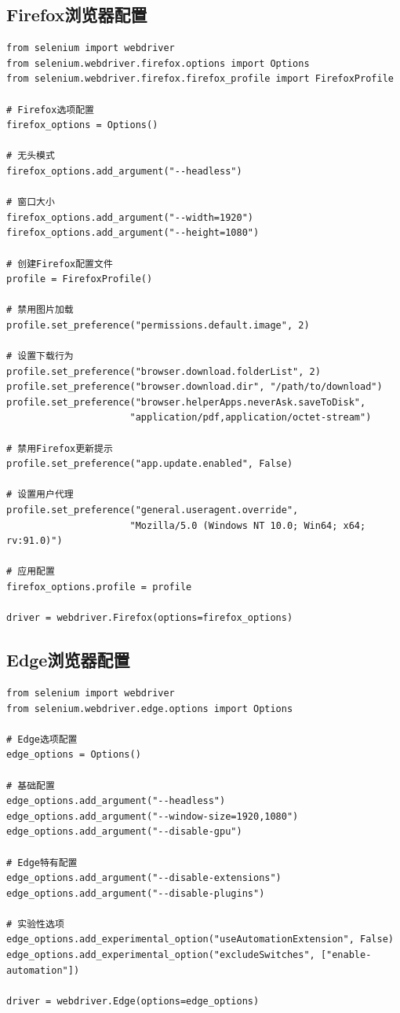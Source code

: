 \subsection{Firefox浏览器配置}

\begin{lstlisting}[style=demostyle,numbers=none]
from selenium import webdriver
from selenium.webdriver.firefox.options import Options
from selenium.webdriver.firefox.firefox_profile import FirefoxProfile

# Firefox选项配置
firefox_options = Options()

# 无头模式
firefox_options.add_argument("--headless")

# 窗口大小
firefox_options.add_argument("--width=1920")
firefox_options.add_argument("--height=1080")

# 创建Firefox配置文件
profile = FirefoxProfile()

# 禁用图片加载
profile.set_preference("permissions.default.image", 2)

# 设置下载行为
profile.set_preference("browser.download.folderList", 2)
profile.set_preference("browser.download.dir", "/path/to/download")
profile.set_preference("browser.helperApps.neverAsk.saveToDisk", 
                      "application/pdf,application/octet-stream")

# 禁用Firefox更新提示
profile.set_preference("app.update.enabled", False)

# 设置用户代理
profile.set_preference("general.useragent.override", 
                      "Mozilla/5.0 (Windows NT 10.0; Win64; x64; rv:91.0)")

# 应用配置
firefox_options.profile = profile

driver = webdriver.Firefox(options=firefox_options)
\end{lstlisting}

\subsection{Edge浏览器配置}

\begin{lstlisting}[style=demostyle,numbers=none]
from selenium import webdriver
from selenium.webdriver.edge.options import Options

# Edge选项配置
edge_options = Options()

# 基础配置
edge_options.add_argument("--headless")
edge_options.add_argument("--window-size=1920,1080")
edge_options.add_argument("--disable-gpu")

# Edge特有配置
edge_options.add_argument("--disable-extensions")
edge_options.add_argument("--disable-plugins")

# 实验性选项
edge_options.add_experimental_option("useAutomationExtension", False)
edge_options.add_experimental_option("excludeSwitches", ["enable-automation"])

driver = webdriver.Edge(options=edge_options)
\end{lstlisting}

